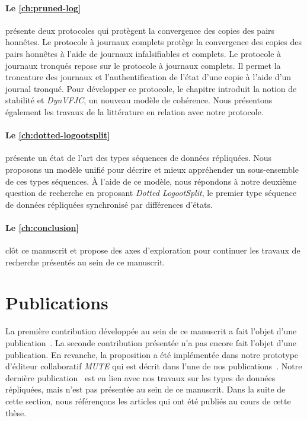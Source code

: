 \paragraph{Le \autoref{ch:pruned-log}} présente deux protocoles qui protègent la convergence des copies des pairs honnêtes.
Le protocole à journaux complets protège la convergence des copies des pairs honnêtes à l'aide de journaux infalsifiables et complets.
Le protocole à journaux tronqués repose sur le protocole à journaux complets.
Il permet la troncature des journaux et l'authentification de l'état d'une copie à l'aide d'un journal tronqué.
Pour développer ce protocole, le chapitre introduit la notion de stabilité et \emph{DynVFJC}, un nouveau modèle de cohérence.
Nous présentons également les travaux de la littérature en relation avec notre protocole.

\paragraph{Le \autoref{ch:dotted-logootsplit}} présente un état de l'art des types séquences de données répliquées.
Nous proposons un modèle unifié pour décrire et mieux appréhender un sous-ensemble de ces types séquences.
À l'aide de ce modèle, nous répondons à notre deuxième question de recherche en proposant \emph{Dotted LogootSplit}, le premier type séquence de données répliquées synchronisé par différences d'états.

\paragraph{Le \autoref{ch:conclusion}} clôt ce manuscrit et propose des axes d'exploration pour continuer les travaux de recherche présentés au sein de ce manuscrit.


\section{Publications}

La première contribution développée au sein de ce manuscrit a fait l'objet d'une publication~\autocite{2018_elvinger_prunable-auth-log}.
La seconde contribution présentée n'a pas encore fait l'objet d'une publication.
En revanche, la proposition a été implémentée dans notre prototype d'éditeur collaboratif \emph{MUTE} qui est décrit dans l'une de nos publications~\autocite{2017_nicolas-mute-demo}.
Notre dernière publication~\autocite{2019_yu_genericundo} est en lien avec nos travaux sur les types de données répliquées, mais n'est pas présentée au sein de ce manuscrit.
Dans la suite de cette section, nous référençons les articles qui ont été publiés au cours de cette thèse.

